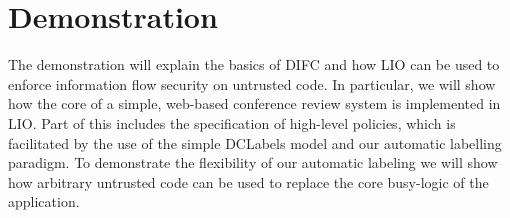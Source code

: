 \section{Demonstration}
\label{sec:demo}
The demonstration will explain the basics of DIFC and how LIO can be
used to enforce information flow security on untrusted code.
%
In particular, we will show how the core of a simple, web-based
conference review system is implemented in LIO.
%
Part of this includes the specification of high-level policies, which
is facilitated by the use of the simple DCLabels model and our
automatic labelling paradigm.
%
To demonstrate the flexibility of our automatic labeling we will show
how arbitrary untrusted code can be used to replace the core
busy-logic of the application.
